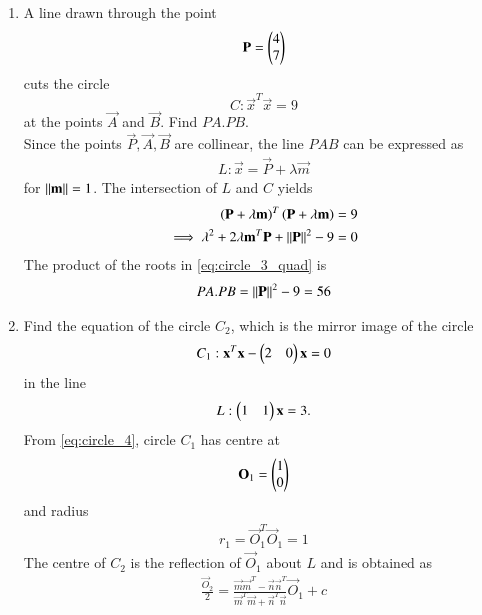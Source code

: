 \documentclass[journal,12pt,twocolumn]{IEEEtran}
\begin{document}
\begin{enumerate}[label=\arabic*]
\item A line drawn through the point 
\begin{equation}
\label{eq:circle_3_p}
\mathbf{P} = \begin{pmatrix}4\\7\end{pmatrix} 
\end{equation}
cuts the circle
\begin{equation}
\label{eq:circle_3}
C: \vec{x}^T\vec{x}  = 9
\end{equation}
at the points $\vec{A}$ and $\vec{B}$. Find $PA.PB$.
\\
\solution Since the points $\vec{P},\vec{A},\vec{B}$ are collinear, the line $PAB$ can be expressed as
\begin{align}
L: \vec{x} = \vec{P} + \lambda \vec{m}
\label{eq:circle_3_pab}
\end{align}
%
for $\left\Vert\mathbf{m}\right\Vert = 1$. The intersection of $L$ and $C$  yields
\begin{align}
\left(\mathbf{P}+ \lambda \mathbf{m}\right)^T
\left(\mathbf{P} + \lambda \mathbf{m}\right) &= 9
\nonumber \\
\implies \lambda^2 + 2\lambda \mathbf{m}^T\mathbf{P} + \left\Vert\mathbf{P}\right\Vert^2-9 &= 0
\label{eq:circle_3_quad}
\end{align}
%
The product of the roots in \eqref{eq:circle_3_quad} is 
\begin{align}
\label{eq:circle_3_prod}
PA.PB =\left\Vert\mathbf{P}\right\Vert^2-9 = 56
\end{align}
%
\item Find the equation of the circle $C_2$, which is the mirror image of the circle
\begin{equation}
C_1: 
\mathbf{x}^T\mathbf{x} -\begin{pmatrix}2 & 0 \end{pmatrix}\mathbf{x} = 0
\label{eq:circle_4}
\end{equation}
in the line
\begin{equation}
L: \begin{pmatrix}1 & 1\end{pmatrix}\mathbf{x} = 3.
\label{eq:circle_4_line}
\end{equation}
\solution From  \eqref{eq:circle_4}, circle $C_1$ has centre at 
\begin{align}
\label{eq:circle_4_o1}
\mathbf{O}_1 = \begin{pmatrix}1 \\ 0 \end{pmatrix}
\end{align}
%
and radius 
\begin{align}
\label{eq:circle_4_r1}
r_1 = \vec{O}_1^T\vec{O}_1 = 1
\end{align}
%
The centre of $C_2$ is the reflection of $\vec{O}_1$ about $L$ and is obtained as 
\begin{align}
\label{eq:circle_4_o2}
\frac{\vec{O}_2}{2} = \frac{\vec{m}\vec{m}^T-\vec{n}\vec{n}^T}{\vec{m}^T\vec{m}+\vec{n}^T\vec{n}}\vec{O}_1 + c 

\end{align}
\end{enumerate}
\end{document}
